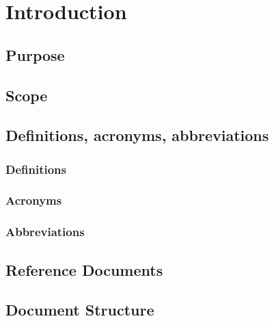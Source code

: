 \section{Introduction} \label{sec:intro}

\subsection{Purpose} \label{subsec:purpose}

\subsection{Scope} \label{subsec:scope}

\subsection{Definitions, acronyms, abbreviations} \label{subsec:def-ac-ab}
\subsubsection{Definitions} \label{def}
\subsubsection{Acronyms} \label{acr}
\subsubsection{Abbreviations} \label{abbre}

\subsection{Reference Documents} \label{ref-doc}

\subsection{Document Structure} \label{doc-struct}